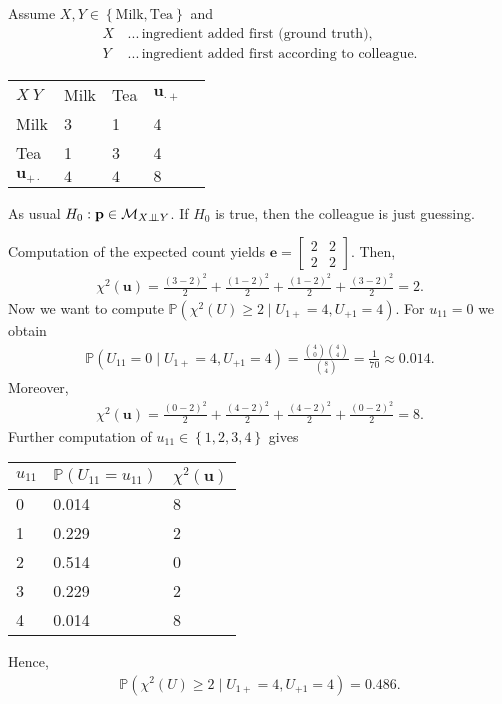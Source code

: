 \begin{eg}
  Assume \( X,Y \in \left\{ \text{Milk},\text{Tea} \right\} \) and
  \begin{align*}
    X \,&...\, \text{ingredient added first (ground truth)}, \\
    Y \, &...\, \text{ingredient added first according to colleague}.
  \end{align*}
  \begin{table}[H]
    \centering
    \begin{tabular}{l|ll|ll}
    $X \ Y$ & Milk & Tea & $\mathbf u_{\cdot +}$  \\ \cline{1-4}
       Milk     & 3    & 1    & 4             \\
        Tea    & 1    & 3    & 4             \\ \cline{1-4}
       \( \mathbf u_{+ \cdot} \)     & \( 4 \)    & \( 4 \)   &       \( 8 \)        
    \end{tabular}
  \end{table}
  As usual \( H_0: \mathbf{p} \in \mathcal{M}_{X \perp \!\!\! \perp Y} \). If \( H_0 \) is true, then the colleague is just guessing.

  Computation of the expected count yields \( \mathbf e = \begin{bmatrix}
    2 & 2 \\ 2 & 2
  \end{bmatrix} \). Then, 
  \begin{align*}
    \chi^2(\mathbf u) = \frac{(3-2)^2}{2} + \frac{(1-2)^2}{2} + \frac{(1-2)^2}{2} + \frac{(3-2)^2}{2} = 2.
  \end{align*}
  Now we want to compute \( \mathbb{P}(\chi^2(U) \geq 2 \mid U_{1+} = 4, U_{+1} = 4) \). For \( u_{11} = 0 \) we obtain 
  \begin{align*}
    \mathbb{P}(U_{11} = 0 \mid  U_{1+} = 4, U_{+1} = 4) = \frac{{4 \choose 0} {4 \choose 4}}{{8 \choose 4}} = \frac{1}{70} \approx 0.014.
  \end{align*}
  Moreover, 
  \begin{align*}
    \chi^2(\mathbf u) = \frac{(0-2)^2}{2} + \frac{(4-2)^2}{2} + \frac{(4-2)^2}{2} + \frac{(0-2)^2}{2} = 8.
  \end{align*}
  Further computation of \( u_{11} \in \left\{ 1,2,3,4 \right\} \)
  gives 
  \begin{table}[H]
    \centering
    \begin{tabular}{l|ll}
    $u_{11}$ & \( \mathbb{P}(U_{11} = u_{11}) \) & \( \chi^2(\mathbf u) \) \\ \hline
    0        & 0.014 & 8    \\
    1        & 0.229 & 2    \\
    2        & 0.514 & 0    \\
    3        & 0.229 & 2    \\
    4        & 0.014 & 8   
    \end{tabular}
    \end{table}
  Hence, 
  \begin{align*}
    \mathbb{P}(\chi^2(U) \geq 2 \mid  U_{1+} = 4, U_{+1} = 4) = 0.486.
  \end{align*}
\end{eg}

